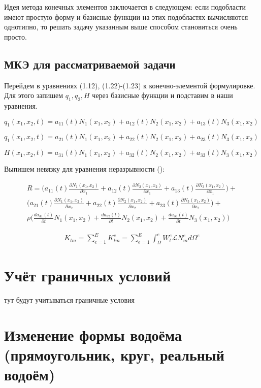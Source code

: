 \documentclass[14pt]{extreport}
\begin{document}
Идея метода конечных элементов заключается в следующем: если подобласти имеют простую форму и базисные функции на этих подобластях вычисляются однотипно, то решать задачу указанным выше способом становиться очень просто. 




\section{МКЭ для рассматриваемой задачи}

Перейдем в уравнениях (1.12), (1.22)-(1.23) к конечно-элементой формулировке. Для этого запишем $q_1, q_2, H$ через базисные функции и подставим в наши уравнения.

$q_1(x_1, x_2, t)=a_{11}(t)N_1(x_1, x_2) + a_{12}(t)N_2(x_1, x_2) + a_{13}(t)N_3(x_1, x_2)$

$q_1(x_1, x_2, t)=a_{21}(t)N_1(x_1, x_2) + a_{22}(t)N_2(x_1, x_2) + a_{23}(t)N_3(x_1, x_2)$

$H(x_1, x_2, t)=a_{31}(t)N_1(x_1, x_2) + a_{32}(t)N_2(x_1, x_2) + a_{33}(t)N_3(x_1, x_2)$


Выпишем невязку для уравнения неразрывности ():

\begin{eqnarray}
R=\bigg(a_{11}(t)\frac{\partial N_1(x_1, x_2)}{\partial x_1} + a_{12}(t)\frac{\partial N_2(x_1, x_2)}{\partial x_1} + a_{13}(t)\frac{\partial N_3(x_1, x_2)}{\partial x_1} \bigg) + \\
	\bigg(a_{21}(t)\frac{\partial N_1(x_1, x_2)}{\partial x_2} + a_{22}(t)\frac{\partial N_2(x_1, x_2)}{\partial x_2} + a_{23}(t)\frac{\partial N_3(x_1, x_2)}{\partial x_2} \bigg) + \\
	\rho\bigg(\frac{d a_{31}(t)}{\partial t}N_1(x_1, x_2) + \frac{d a_{32}(t)}{\partial t}N_2(x_1, x_2) + \frac{d a_{33}(t)}{\partial t}N_3(x_1, x_2) \bigg)
\end{eqnarray}


\begin{eqnarray}
	K_{lm}=\sum\limits_{e=1}^{E} K_{lm}^{e}=\sum\limits_{e=1}^{E}\int_\Omega^{e} W_l^{e} \mathcal L N_{m}^{e}  d\Omega^{e}
\end{eqnarray}

\chapter{Учёт граничных условий}

тут будут учитываться граничные условия


\chapter{Изменение формы водоёма (прямоугольник, круг, реальный водоём)}
\end{document}
